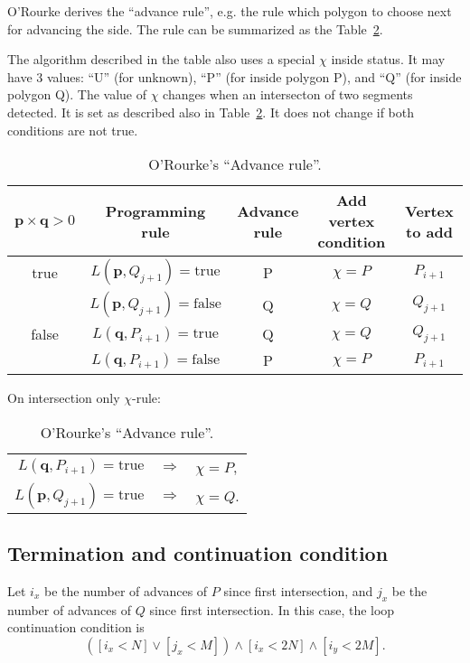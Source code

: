 O'Rourke derives the ``advance rule'', e.g. the rule which polygon to
choose next for advancing the side. The rule can be summarized as the
Table~\ref{tab:arule}.

The algorithm described in the table also uses a special $\chi$ inside
status. It may have 3 values: ``U'' (for unknown), ``P'' (for inside
polygon P), and ``Q'' (for inside polygon Q). The value of $\chi$
changes when an intersecton of two segments detected. It is set as
described also in Table~\ref{tab:arule}.  It does not change if both
conditions are not true.
%
\begin{table}
  \center
  \caption{O'Rourke's ``Advance rule''.}
  \begin{tabular}{c|c|c|c|c}
    \hline
    $\bm{p}\times\bm{q} > 0$ & Programming rule & Advance rule & Add
    vertex condition & Vertex to add\\
    \hline
    true  & $L(\bm{p},Q_{j+1})=\text{true}$ & P & $\chi=P$ & $P_{i+1}$ \\
          & $L(\bm{p},Q_{j+1})=\text{false}$ & Q & $\chi=Q$ & $Q_{j+1}$ \\
    \hline
    false & $L(\bm{q},P_{i+1})=\text{true}$ & Q & $\chi=Q$& $Q_{j+1}$ \\
          & $L(\bm{q},P_{i+1})=\text{false}$ & P & $\chi=P$ & $P_{i+1}$ \\
    \hline
  \end{tabular}
  On intersection only $\chi$-rule:
  \begin{tabular}{rll}
    $L(\bm{q},P_{i+1})=\text{true}$ & $\Rightarrow$ & $\chi=P$, \\
    $L(\bm{p},Q_{j+1})=\text{true}$ & $\Rightarrow$ & $\chi=Q$.
  \end{tabular}
  \label{tab:arule}
\end{table}

\subsection{Termination and continuation condition}

Let $i_x$ be the number of advances of $P$ since first intersection,
and $j_x$ be the number of advances of $Q$ since first
intersection. In this case, the loop continuation condition is
\begin{equation}
  \left( [i_x < N] \lor [j_x < M] \right) \land [i_x < 2N] \land [i_y < 2M].
\end{equation}


